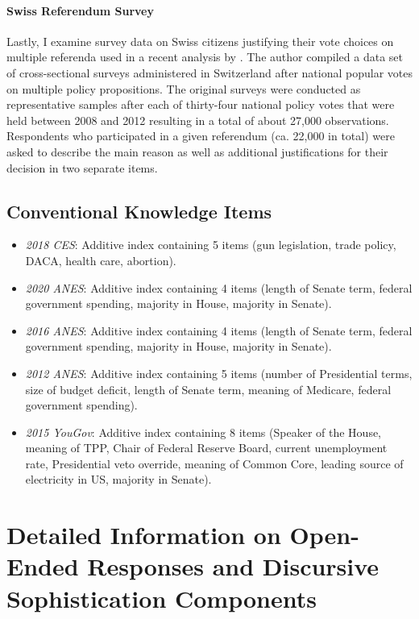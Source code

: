 \documentclass[12pt]{article}
\begin{document}
\paragraph{Swiss Referendum Survey}
Lastly, I examine survey data on Swiss citizens justifying their vote choices on multiple referenda used in a recent analysis by \citet{colombo2016justifications}. The author compiled a data set of cross-sectional surveys administered in Switzerland after national popular votes on multiple policy propositions. The original surveys were conducted as representative samples after each of thirty-four national policy votes that were held between 2008 and 2012 resulting in a total of about 27,000 observations. Respondents who participated in a given referendum (ca. 22,000 in total) were asked to describe the main reason as well as additional justifications for their decision in two separate items. 


\subsection{Conventional Knowledge Items}

\begin{itemize}
	\item \textit{2018 CES}: Additive index containing 5 items (gun legislation, trade policy, DACA, health care, abortion).
	\item \textit{2020 ANES}: Additive index containing 4 items (length of Senate term, federal government spending, majority in House, majority in Senate).
	\item \textit{2016 ANES}: Additive index containing 4 items (length of Senate term, federal government spending, majority in House, majority in Senate).
	\item \textit{2012 ANES}: Additive index containing 5 items (number of Presidential terms, size of budget deficit, length of Senate term, meaning of Medicare, federal government spending).
	\item \textit{2015 YouGov}: Additive index containing 8 items (Speaker of the House, meaning of TPP, Chair of Federal Reserve Board, current unemployment rate, Presidential veto override, meaning of Common Core, leading source of electricity in US, majority in Senate).
\end{itemize}



\clearpage
\section[Information on Discursive Sophistication Components]{Detailed Information on Open-Ended Responses and Discursive Sophistication Components}\label{app:oeinfo}
\end{document}
